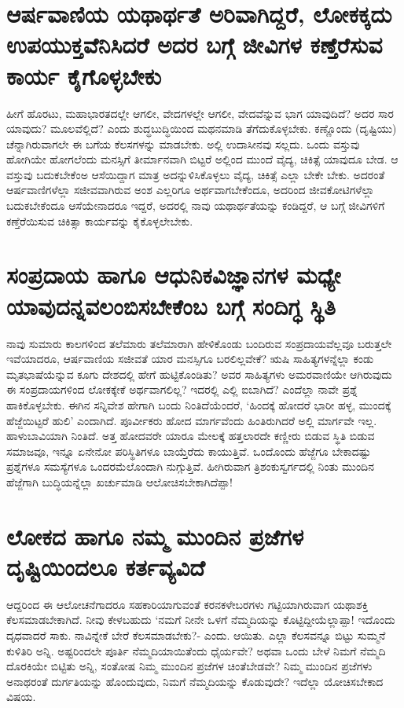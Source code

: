 \section*{ಆರ್ಷವಾಣಿಯ ಯಥಾರ್ಥತೆ ಅರಿವಾಗಿದ್ದರೆ, ಲೋಕಕ್ಕದು ಉಪಯುಕ್ತವೆನಿಸಿದರೆ ಅದರ ಬಗ್ಗೆ ಜೀವಿಗಳ ಕಣ್ತೆರೆಸುವ ಕಾರ್ಯ ಕೈಗೊಳ್ಳಬೇಕು}

ಹೀಗೆ ಹೊರಟು, ಮಹಾಭಾರತದಲ್ಲೇ ಆಗಲೀ, ವೇದಗಳಲ್ಲೇ ಆಗಲೀ, ವೇದವೆನ್ನುವ ಭಾಗ ಯಾವುದಿದೆ? ಅದರ ಸಾರ ಯಾವುದು? ಮೂಲವೆಲ್ಲಿದೆ? ಎಂದು ಶುದ್ಧಬುದ್ಧಿಯಿಂದ ಮಥನಮಾಡಿ ತೆಗೆದುಕೊಳ್ಳಬೇಕು. ಕಣ್ಣೊಂದು (ದೃಷ್ಟಿಯು) ಚೆನ್ನಾಗಿರುವಾಗಲೇ ಈ ಬಗೆಯ ಕೆಲಸಗಳನ್ನು ಮಾಡಬೇಕು. ಅಲ್ಲಿ ಉದಾಸೀನವು ಸಲ್ಲದು. ಒಂದು ವಸ್ತುವು ಹೋಗಿಯೇ ಹೋಗಲೆಂದು ಮನಸ್ಸಿಗೆ ತೀರ್ಮಾನವಾಗಿ ಬಿಟ್ಟರೆ ಅಲ್ಲಿಂದ ಮುಂದೆ ವೈದ್ಯ, ಚಿಕಿತ್ಸೆ ಯಾವುದೂ ಬೇಡ. ಆ ವಸ್ತುವು ಬದುಕಬೇಕೆಂಅ ಆಸೆಯಿದ್ದಾಗ ಮಾತ್ರ ಅದನ್ನುಳಿಸಿಕೊಳ್ಳಲು ವೈದ್ಯ, ಚಿಕಿತ್ಸೆ ಎಲ್ಲಾ ಬೇಕೇ ಬೇಕು. ಅದರಂತೆ ಆರ್ಷವಾಣಿಗಳೆಲ್ಲಾ ಸಜೀವವಾಗಿರುವ ಅಂಶ ಎಲ್ಲರಿಗೂ ಅರ್ಥವಾಗಬೇಕೆಂದೂ, ಅದರಿಂದ ಜೀವಕೋಟಿಗಳೆಲ್ಲಾ ಬದುಕಬೇಕೆಂದೂ ಆಸೆಯೇನಾದರೂ ಇದ್ದರೆ, ಅದರಲ್ಲಿ ನಾವು ಯಥಾರ್ಥತೆಯನ್ನು ಕಂಡಿದ್ದರೆ, ಆ ಬಗ್ಗೆ ಜೀವಿಗಳಿಗೆ ಕಣ್ತೆರೆಯಿಸುವ ಚಿಕಿತ್ಸಾ ಕಾರ್ಯವನ್ನು ಕೈಕೊಳ್ಳಲೇಬೇಕು.

\section*{ಸಂಪ್ರದಾಯ ಹಾಗೂ ಆಧುನಿಕವಿಜ್ಞಾನಗಳ ಮಧ್ಯೇ ಯಾವುದನ್ನವಲಂಬಿಸಬೇಕೆಂಬ ಬಗ್ಗೆ ಸಂದಿಗ್ಧ ಸ್ಥಿತಿ}

ನಾವು ಸುಮಾರು ಕಾಲಗಳಿಂದ ತಲೆಮಾರು ತಲೆಮಾರಾಗಿ ಹೇಳಿಕೊಂಡು ಬಂದಿರುವ ಸಂಪ್ರದಾಯವೆಲ್ಲವೂ ಬರುತ್ತಲೇ ಇವೆಯಾದರೂ, ಆರ್ಷವಾಣಿಯ ಸಜೀವತೆ ಯಾರ ಮನಸ್ಸಿಗೂ ಬರಲಿಲ್ಲವೇಕೆ? ಋಷಿ ಸಾಹಿತ್ಯಗಳನ್ನೆಲ್ಲಾ ಕಂಡು ಮೃತಭಾಷೆಯೆನ್ನುವ ಕೂಗು ದೇಶದಲ್ಲಿ ಹೇಗೆ ಹುಟ್ಟಿಕೊಂಡಿತು? ಅವರ ಸಾಹಿತ್ಯಗಳು ಅಮರವಾಣಿಯೇ ಆಗಿರುವುದು ಈ ಸಂಪ್ರದಾಯಗಳಿಂದ ಲೋಕಕ್ಕೇಕೆ ಅರ್ಥವಾಗಲಿಲ್ಲ? ಇದರಲ್ಲಿ ಎಲ್ಲಿ ಐಬಾಗಿದೆ? ಎಂದೆಲ್ಲಾ ನಾವೇ ಪ್ರಶ್ನೆ ಹಾಕಿಕೊಳ್ಳಬೇಕು. ಈಗಿನ ಸನ್ನಿವೇಶ ಹೇಗಾಗಿ ಬಂದು ನಿಂತಿದೆಯೆಂದರೆ, `ಹಿಂದಕ್ಕೆ ಹೋದರೆ ಭಾರೀ ಹಳ್ಳ, ಮುಂದಕ್ಕೆ ಹೆಜ್ಜೆಯಿಟ್ಟರೆ ಹುಲಿ'  ಎಂದಾಗಿದೆ. ಪೂರ್ವೀಕರು ಹೋದ ಮಾರ್ಗವೆಂದು ಹಿಂತಿರುಗಿದರೆ ಅಲ್ಲಿ ಮಾರ್ಗವೇ ಇಲ್ಲ. ಹಾಳುಬಾವಿಯಾಗಿ ನಿಂತಿದೆ. ಅತ್ತ ಹೋದವರೇ ಯಾರೂ ಮೇಲಕ್ಕೆ ಹತ್ತಲಾರದೇ ಕಣ್ಣೀರು ಬಿಡುವ ಸ್ಥಿತಿ ಬಿಡುವ ಸಮಾಜವೂ, ಇನ್ನೂ ಏನೇನೋ ಪರಿಸ್ಥಿತಿಗಳೂ ಬಾಯ್ತೆರೆದು ಕಾಯುತ್ತಿವೆ. ಒಂದೊಂದು ಹೆಜ್ಜೆಗೂ ಬೇಕಾದಷ್ಟು ಪ್ರಶ್ನೆಗಳೂ ಸಮಸ್ಯೆಗಳೂ ಒಂದರಮೆಲೊಂದಾಗಿ ನುಗ್ಗುತ್ತಿವೆ. ಹೀಗಿರುವಾಗ ತ್ರಿಶಂಕುಸ್ವರ್ಗದಲ್ಲಿ ನಿಂತು ಮುಂದಿನ ಹೆಜ್ಜೆಗಾಗಿ ಬುದ್ಧಿಯನ್ನೆಲ್ಲಾ ಖರ್ಚುಮಾಡಿ ಆಲೋಚಿಸಬೇಕಾಗಿದೆಪ್ಪಾ!

\section*{ಲೋಕದ ಹಾಗೂ ನಮ್ಮ ಮುಂದಿನ ಪ್ರಜೆಗಳ ದೃಷ್ಟಿಯಿಂದಲೂ ಕರ್ತವ್ಯವಿದೆ}

ಆದ್ದರಿಂದ ಈ ಆಲೋಚನೆಗಾದರೂ ಸಹಕಾರಿಯಾಗುವಂತೆ ಕರನಕಳೇಬರಗಳು ಗಟ್ಟಿಯಾಗಿರುವಾಗ ಯಥಾಶಕ್ತಿ ಕೆಲಸಮಾಡಬೇಕಾಗಿದೆ. ನೀವು ಕೇಳಬಹುದು `ನಮಗೆ ನೀನೇ ಒಳಗೆ ನೆಮ್ಮದಿಯನ್ನು ಕೊಟ್ಟಿದ್ದೀಯೆಲ್ಲಾಪ್ಪಾ! ಇದೊಂದು ದೃಧವಾದರೆ ಸಾಕು. ನಾವಿನ್ನೇಕೆ ಬೇರೆ ಕೆಲಸಮಾಡಬೇಕು?- ಎಂದು. ಆಯಿತು. ಎಲ್ಲಾ ಕೆಲಸವನ್ನೂ ಬಿಟ್ಟು ಸುಮ್ಮನೆ ಕುಳಿತಿರಿ ಅನ್ನಿ. ಅಷ್ಟರಿಂದಲೇ ಪೂರ್ತಿ ನೆಮ್ಮದಿಯಾಯಿತೆಂದು ಧೈರ್ಯವೇ? ಅಥವಾ ಒಂದು ಬೇಳೆ ನಿಮಗೆ ನೆಮ್ಮದಿ ದೊರಕಿಯೇ ಬಿಟ್ಟಿತು ಅನ್ನಿ, ಸಂತೋಷ ನಿಮ್ಮ ಮುಂದಿನ ಪ್ರಜೆಗಳ ಚಿಂತೆಬೇಡವೇ? ನಿಮ್ಮ ಮುಂದಿನ ಪ್ರಜೆಗಳು ಅನಾಥರಂತೆ ದುರ್ಗತಿಯನ್ನು ಹೊಂದುವುದು, ನಿಮಗೆ ನೆಮ್ಮದಿಯನ್ನು ಕೊಡುವುದೇ? ಇದೆಲ್ಲಾ ಯೋಚಿಸಬೇಕಾದ ವಿಷಯ.

